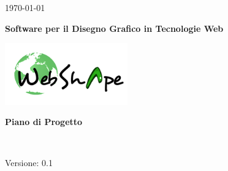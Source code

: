 
\title{\TITOLODOC}
\author{Piero Bizzotto}



\renewcommand{\insertversion}{0.1} %
\renewcommand{\TITOLODOC}{Piano di Progetto} %
\renewcommand{\glosspath}{.\glossario} %

\begin{titlepage}
\begin{center}
	\begin{Large}	\today \end{Large}
\end{center}

\vspace{20pt}

\begin{center}
	\begin{Huge}
				\textbf{\ajax}
	\end{Huge}
\end{center}			

\begin{center}
	\begin{large}
				\textbf{Software per il Disegno Grafico in Tecnologie Web}
	\end{large}
\end{center}			

\vspace{20pt}

\begin{center}
\includegraphics[width=150pt]{../logo/logo}
\end{center}

\vspace{170pt}
\begin{center} %
	\begin{Huge}
				\textbf{\TITOLODOC}
	\end{Huge}
			\\
\end{center}
\vspace{210pt}
\begin{center}
Versione: \insertversion
\end{center}
\end{titlepage}

